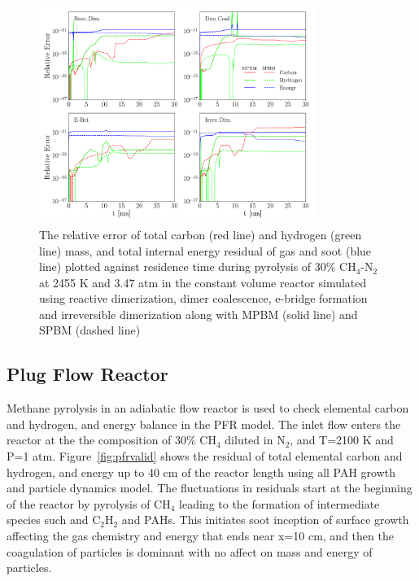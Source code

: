 \begin{figure}[H]
	\centering
	\includegraphics[width=0.8\textwidth]{Figures/Results/Validation/ConstUV/relerr_constuv.pdf}
	\caption{The relative error of total carbon (red line) and hydrogen (green line) mass, and total internal energy residual of gas and soot (blue line) plotted against residence time during pyrolysis of 30\% $\mathrm{CH_4}$-$\mathrm{N_2}$ at 2455 K and 3.47 atm in the constant volume reactor simulated using reactive dimerization, dimer coalescence, e-bridge formation and irreversible dimerization along with MPBM (solid line) and SPBM (dashed line)}
	\label{fig:constuvvalid}
\end{figure}

\subsection{Plug Flow Reactor}
Methane pyrolysis in an adiabatic flow reactor is used to check elemental carbon and hydrogen, and energy balance in the PFR model. The inlet flow enters the reactor at the the composition of 30\% $\mathrm{CH_4}$ diluted in $\mathrm{N_2}$, and T=2100 K and P=1 atm. Figure~\ref{fig:pfrvalid} shows the residual of total elemental carbon and hydrogen, and energy up to 40 cm of the reactor length using all PAH growth and particle dynamics model. The fluctuations in residuals start at the beginning of the reactor by pyrolysis of $\mathrm{CH_4}$ leading to the formation of intermediate species such and $\mathrm{C_2H_2}$ and PAHs. This initiates soot inception of surface growth affecting the gas chemistry and energy that ends near x=10 cm, and then the coagulation of particles is dominant with no affect on mass and energy of particles.




